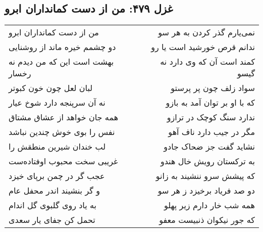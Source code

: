 \begin{center}
\section*{غزل ۴۷۹: من از دست کمانداران ابرو}
\label{sec:479}
\begin{longtable}{l p{0.5cm} r}
من از دست کمانداران ابرو
&&
نمی‌یارم گذر کردن به هر سو
\\
دو چشمم خیره ماند از روشنایی
&&
ندانم قرص خورشید است یا رو
\\
بهشت است این که من دیدم نه رخسار
&&
کمند است آن که وی دارد نه گیسو
\\
لبان لعل چون خون کبوتر
&&
سواد زلف چون پر پرستو
\\
نه آن سرپنجه دارد شوخ عیار
&&
که با او بر توان آمد به بازو
\\
همه جان خواهد از عشاق مشتاق
&&
ندارد سنگ کوچک در ترازو
\\
نفس را بوی خوش چندین نباشد
&&
مگر در جیب دارد ناف آهو
\\
لب خندان شیرین منطقش را
&&
نشاید گفت جز ضحاک جادو
\\
غریبی سخت محبوب اوفتاده‌ست
&&
به ترکستان رویش خال هندو
\\
عجب گر در چمن برپای خیزد
&&
که پیشش سرو ننشیند به زانو
\\
و گر بنشیند اندر محفل عام
&&
دو صد فریاد برخیزد ز هر سو
\\
به یاد روی گلبوی گل اندام
&&
همه شب خار دارم زیر پهلو
\\
تحمل کن جفای یار سعدی
&&
که جور نیکوان ذنبیست معفو
\\
\end{longtable}
\end{center}
